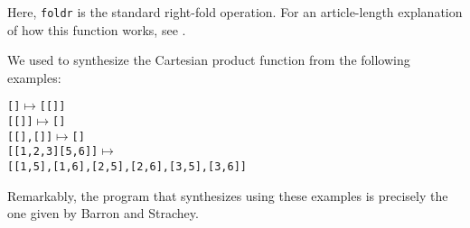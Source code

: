 Here, \verb+foldr+ is the standard right-fold
operation. For an article-length explanation of how this function
works, see \cite{spivey-example}.

\begin{comment}
  Note the complex interplay of scoping and higher-order functions:
  there are three nested fold operations, the occurrence of {\tt x} in
  Line 4 is bound by the enclosing definition of {\tt g}, and the
  occurrence of {\tt yss} in Line 3 is bound by the enclosing
  definition of {\tt f}. It seems safe to say that even expert
  programmers would take a while to understand the program.
\end{comment}

We used \sys to synthesize the Cartesian
product function from the following examples:

{\small 
\begin{alltt}
[] \(\mapsto\) [[]]
[[]] \(\mapsto\) []
[[], []] \(\mapsto\) []
[[1, 2, 3] [5, 6]] \(\mapsto\) 
[[1, 5], [1, 6], [2, 5], [2, 6], [3, 5], [3, 6]]
\end{alltt}
}

Remarkably, the program that \sys synthesizes using these examples is
precisely the one given by Barron and Strachey. %


